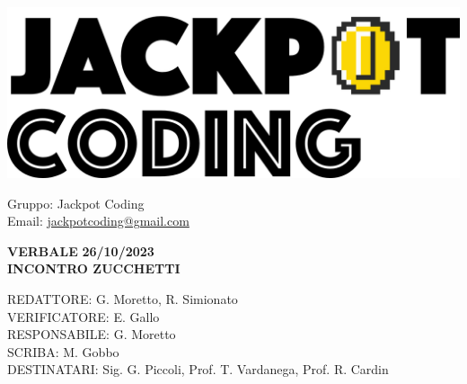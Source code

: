 \documentclass[5pt]{article}
\begin{document}
\begin{minipage}[t]{0.50\textwidth}
    \begin{flushleft}
        \hspace{10pt}
        \includegraphics[scale=0.65]{jackpot-logo.png} 
    \end{flushleft}
\end{minipage}
\hspace{-60pt} %
\begin{flushright}
    \begin{minipage}[t]{0.50\textwidth}
        \begin{flushright}
            Gruppo: {\Large Jackpot Coding}\\
            Email: \href{mailto:jackpotcoding@gmail.com}{jackpotcoding@gmail.com}
        \end{flushright}
    \end{minipage}
\end{flushright}

\vspace{24pt}

\begin{center}
    \textbf{\large VERBALE }
    \textbf{\large 26/10/2023} \\
    \textbf{\LARGE INCONTRO ZUCCHETTI}
\end{center}

\vspace{13pt}

\begin{flushleft}
    \begin{spacing}{1.5}
        REDATTORE:  G. Moretto, R. Simionato\\%
        VERIFICATORE:   E. Gallo\\%
        RESPONSABILE:   G. Moretto\\%
        \vspace{7pt}
        SCRIBA: M. Gobbo\\%
        \vspace{7pt}
        DESTINATARI:   Sig. G. Piccoli, Prof. T. Vardanega, Prof. R. Cardin\\%
    \end{spacing}
\end{flushleft}
\end{document}
